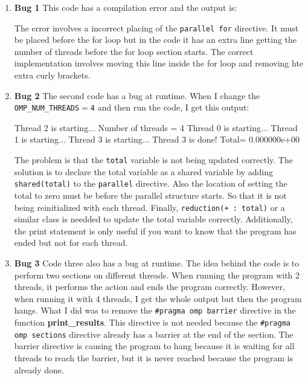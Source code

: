 \documentclass[unicode,11pt,a4paper,oneside,numbers=endperiod,openany]{scrartcl}
\begin{document}
\begin{enumerate}
  \item \textbf{Bug 1} This code has a compilation error and the output is:
  \begin{grayverbatim}
omp_bug1.c:25:3: error: statement after '#pragma omp parallel for' must be a for loop
  {
  ^
1 error generated.
  \end{grayverbatim}

The error involves a incorrect placing of the \texttt{parallel for} directive.
It must be placed before the for loop but in the code it has an extra line
getting the number of threads before the for loop section starts. The correct
implementation involves moving this line inside the for loop and removing hte
extra curly brackets.

  \item \textbf{Bug 2}
The second code has a bug at runtime. When I change the 
\texttt{OMP\_NUM\_THREADS$=$4} and then run the code, I get this output:
\begin{grayverbatim}
Thread 2 is starting...
Number of threads = 4
Thread 0 is starting...
Thread 1 is starting...
Thread 3 is starting...
Thread 3 is done! Total= 0.000000e+00
\end{grayverbatim}

  The problem is that the \texttt{total} variable is not being updated correctly.
  The solution is to declare the total variable as a shared variable by adding
  \texttt{shared(total)} to the \texttt{parallel} directive. Also the location of
  setting the total to zero must be before the parallel structure starts. So that
  it is not being reinitialized with each thread. Finally, \texttt{reduction(+ :
  total)} or a similar class is needded to update the total variable correctly.
  Additionally, the print
  statement is only useful if you want to know that the program has ended but not
  for each thread. 

  \item \textbf{Bug 3}
  Code three also has a bug at runtime. The idea behind the code is to perform two
  sections on different threads. When running the program with 2 threads, it
  performs the action and ends the program correctly. However, when running it
  with 4 threads, I get the whole output but then the program hangs.
  What I did was to remove the \texttt{\#pragma omp barrier} directive in the
  function \textbf{print\_results}. This directive is not needed because the
  \texttt{\#pragma omp sections} directive already has a barrier at the end of
  the section. The barrier directive is causing the program to hang because it
  is waiting for all threads to reach the barrier, but it is never
  reached because the program is already done.


\end{enumerate}
\end{document}
